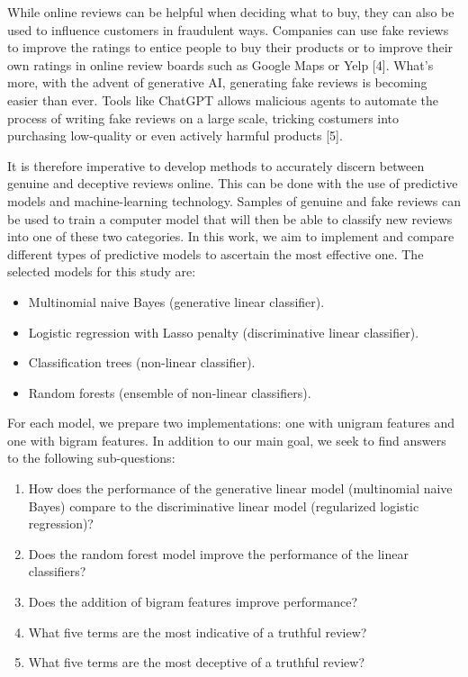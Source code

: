 \documentclass[a4paper,11pt]{article}
\begin{document}
While online reviews can be helpful when deciding what to buy, they can also be used to influence customers in fraudulent ways. Companies can use fake reviews to improve the ratings to entice people to buy their products or to improve their own ratings in online review boards such as Google Maps or Yelp [4].
What's more, with the advent of generative AI, generating fake reviews is becoming easier than ever. Tools like ChatGPT allows malicious agents to automate the process of writing fake reviews on a large scale, tricking costumers into purchasing low-quality or even actively harmful products [5].    

It is therefore imperative to develop methods to accurately discern between genuine and deceptive reviews online. This can be done with the use of predictive models and machine-learning technology. Samples of genuine and fake reviews can be used to train a computer model that will then be able to classify new reviews into one of these two categories.      
In this work, we aim to implement and compare different  types of predictive models to ascertain the most effective one. The selected models for this study are:

\begin{itemize}
  \item Multinomial naive Bayes (generative linear classifier).
  \item Logistic regression with Lasso penalty (discriminative linear classifier).
  \item Classification trees (non-linear classifier).
  \item Random forests (ensemble of non-linear classifiers).
\end{itemize}

For each model, we prepare two implementations: one with unigram features and one with bigram features. In addition to our main goal, we seek to find answers to the following sub-questions:

\begin{enumerate}
\item How does the performance of the generative linear model (multinomial naive Bayes)
compare to the discriminative linear model (regularized logistic regression)?
\item Does the random forest model improve the performance of the linear classifiers?
\item Does the addition of bigram features improve performance? 
\item What five terms are the most indicative of a truthful review?
\item What five terms are the most deceptive of a truthful review?
\end{enumerate}
\end{document}
